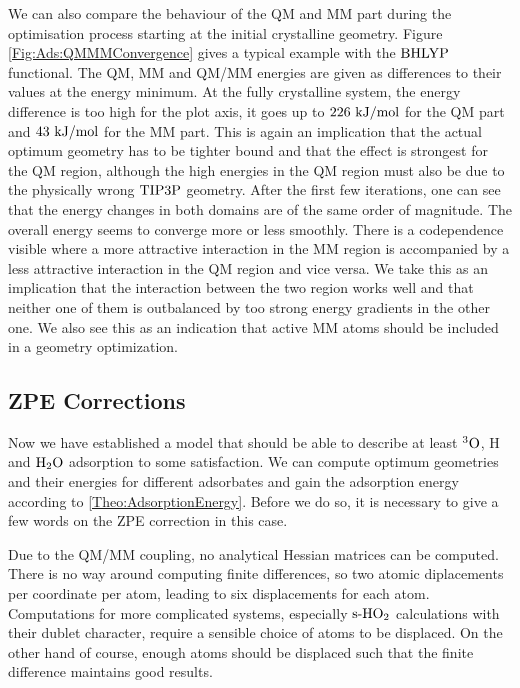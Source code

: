 \documentclass[8.5pt,twoside,twocolumn]{article}
\newcommand\sur{\enmat{\te{s-}}}
\newcommand\tripo{\enmat{{^3\te{O}}}}
\newcommand\kmo{\enmat{\te {kJ/mol}}}
\theoremstyle{standard}
\begin{document}
We can also compare the behaviour of the QM and MM part during the optimisation
process starting at the initial crystalline geometry. Figure \ref{Fig:Ads:QMMMConvergence}
gives a typical example with the $\text{BHLYP}$ functional. The QM, MM and
QM/MM energies are given as differences to their values at the energy minimum.
At the fully crystalline system, the energy difference is too high for the plot axis, it goes up to $226~\kmo$ for the
QM part and $43~\kmo$ for the MM part. This is again an implication that the actual
optimum geometry has to be tighter bound and that the effect is strongest for the
QM region, although the high energies in the QM region must also be due to the
physically wrong $\text{TIP3P}$ geometry. After the first few iterations, one can see
that the energy changes in both domains are of the same order of magnitude. The
overall energy seems to converge more or less smoothly. There is a codependence
visible where a more attractive interaction in the MM region is accompanied by
a less attractive interaction in the QM region and vice versa. We take this as
an implication that the interaction between the two region works well and that
neither one of them is outbalanced by too strong energy gradients in the other
one. We also see this as an indication that active MM atoms should be included
in a geometry optimization.

\subsection{ZPE Corrections}
\label{Sec:Ads:ZPE}

Now we have established a model that should be able to describe at least $\tripo$, 
H and $\text H _2 \text O$ adsorption to some satisfaction. We can compute optimum geometries
and their energies for different adsorbates and gain the adsorption energy
according to \eqref{Theo:AdsorptionEnergy}. Before we do so, it is necessary
to give a few words on the ZPE correction in this case.

Due to the QM/MM coupling, no analytical Hessian matrices can be computed.
There is no way around computing finite differences, so two atomic
diplacements per coordinate per atom, leading to six displacements
for each atom. Computations for more complicated systems, especially $\sur\hot$ calculations
with their dublet character, require a sensible choice
of atoms to be displaced. On the other hand of course, enough atoms should
be displaced such that the finite difference maintains good results.
\end{document}
